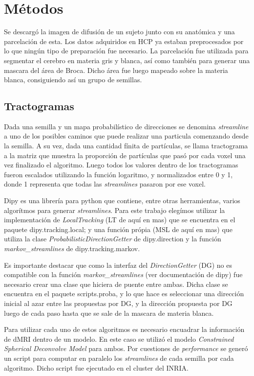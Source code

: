 
\section{M\'etodos}
Se descarg\'o la imagen de difusi\'on de un sujeto junto con su anat\'omica y una 
parcelaci\'on de esta. Los datos adquiridos en HCP ya estaban preprocesados
por lo que ning\'un tipo de preparaci\'on fue necesario. La parcelaci\'on 
fue utilizada para segmentar el cerebro en materia gris y blanca, as\'i como 
tambi\'en para generar una mascara del \'area de Broca. Dicho \'area  fue luego
mapeado sobre la materia blanca, consiguiendo as\'i un grupo de semillas.

\subsection{Tractogramas}
Dada una semilla y un mapa probabil\'istico de direcciones se denomina 
\textit{streamline} a uno de los posibles caminos que puede realizar una particula
comenzando desde la semilla. A su vez, dada una cantidad f\'inita de 
part\'iculas, se llama tractograma a la matriz que muestra la proporci\'on de
part\'iculas que pas\'o por cada voxel una vez finalizado el algoritmo. Luego 
todos los valores dentro de los tractogramas fueron escalados utilizando la 
funci\'on logaritmo, y normalizados entre 0 y 1, donde 1 representa que todas
las \textit{streamlines} pasaron por ese voxel. 

Dipy es una librer\'ia para python que contiene, 
entre otras herramientas, varios algor\'itmos para generar \textit{streamlines}.
Para este trabajo eleg\'imos utilizar la implementaci\'on de
\textit{LocalTracking} (LT de aqu\'i en mas) que se encuentra en el paquete
dipy.tracking.local; y una funci\'on pr\'opia (MSL de aqu\'i
en mas) que utiliza la clase \textit{ProbabilisticDirectionGetter} de
dipy.direction y la funci\'on \textit{markov\_streamlines} de dipy.tracking.markov.

Es importante destacar que como la interfaz del \textit{DirectionGetter} (DG) 
no es compatible con la funci\'on \textit{markov\_streamlines} (ver documentaci\'on
de dipy) fue necesario crear una clase que hiciera de puente entre ambas. Dicha 
clase se encuentra en el paquete scripts.proba, y lo que hace es seleccionar 
una direcci\'on inicial al azar entre las propuestas por DG, y la direcci\'on
propuesta por DG luego de cada paso hasta que se sale de la mascara de materia
blanca. 

Para utilizar cada uno de estos algoritmos es necesario encuadrar la informaci\'on
de dMRI dentro de un modelo. En este caso se utiliz\'o el modelo 
\textit{ Constrained Spherical Deconvolve Model} para ambos.  
Por cuestiones de \textit{performance} se gener\'o un script para computar en
paralelo los \textit{streamlines} de cada semilla por cada algoritmo. Dicho script 
fue ejecutado en el cluster del INRIA.

